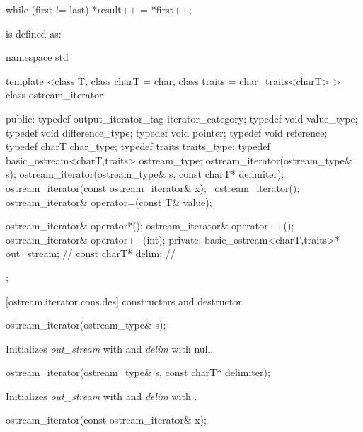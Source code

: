 \begin{codeblock}
while (first != last)
  *result++ = *first++;
\end{codeblock}

\pnum
{}
is defined as:

\begin{codeblock}
namespace std {
  template <class T, class charT = char, class traits = char_traits<charT> >
  class ostream_iterator {
  public:
    typedef output_iterator_tag iterator_category;
    typedef void value_type;
    typedef void difference_type;
    typedef void pointer;
    typedef void reference;
    typedef charT char_type;
    typedef traits traits_type;
    typedef basic_ostream<charT,traits> ostream_type;
    ostream_iterator(ostream_type& s);
    ostream_iterator(ostream_type& s, const charT* delimiter);
    ostream_iterator(const ostream_iterator& x);
   ~ostream_iterator();
    ostream_iterator& operator=(const T& value);

    ostream_iterator& operator*();
    ostream_iterator& operator++();
    ostream_iterator& operator++(int);
  private:
    basic_ostream<charT,traits>* out_stream;  // \expos
    const charT* delim;                       // \expos
  };
}
\end{codeblock}

[ostream.iterator.cons.des]{ constructors and destructor}


%
\begin{itemdecl}
ostream_iterator(ostream_type& s);
\end{itemdecl}

\begin{itemdescr}
\pnum
\effects
Initializes \textit{out_stream} with  and \textit{delim} with null.
\end{itemdescr}


%
\begin{itemdecl}
ostream_iterator(ostream_type& s, const charT* delimiter);
\end{itemdecl}

\begin{itemdescr}
\pnum
\effects
Initializes \textit{out_stream} with  and \textit{delim} with .
\end{itemdescr}


%
\begin{itemdecl}
ostream_iterator(const ostream_iterator& x);
\end{itemdecl}


